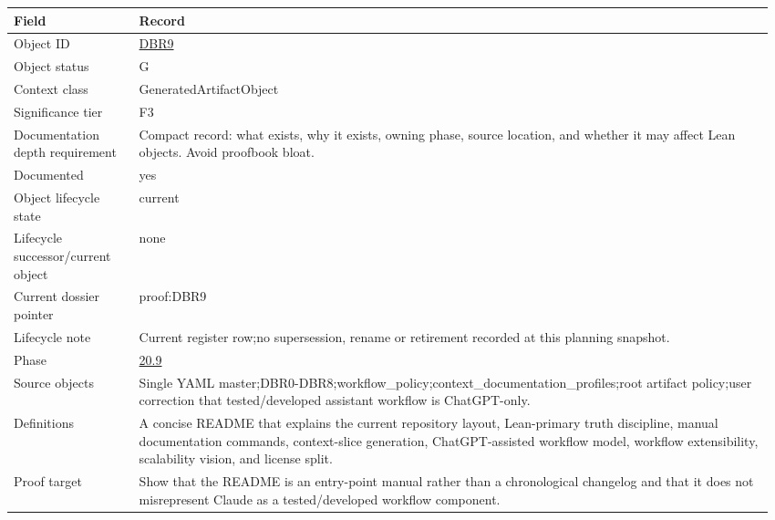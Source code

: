 \begin{longtable}{L{0.16\linewidth} L{0.81\linewidth}}
\hline
\textbf{Field} & \textbf{Record}\\
\hline
Object ID & \hyperlink{object-row-DBR9}{DBR9}\\
\hline\addlinespace[0.20em]
Object status & G\\
\hline\addlinespace[0.20em]
Context class & GeneratedArtifactObject\\
\hline\addlinespace[0.20em]
Significance tier & F3\\
\hline\addlinespace[0.20em]
Documentation depth requirement & Compact record: what exists, why it exists, owning phase, source location, and whether it may affect Lean objects. Avoid proofbook bloat.\\
\hline\addlinespace[0.20em]
Documented & yes\\
\hline\addlinespace[0.20em]
Object lifecycle state & current\\
\hline\addlinespace[0.20em]
Lifecycle successor/\allowbreak{}current object & none\\
\hline\addlinespace[0.20em]
Current dossier pointer & proof:DBR9\\
\hline\addlinespace[0.20em]
Lifecycle note & Current register row;\newline no supersession, rename or retirement recorded at this planning snapshot.\\
\hline\addlinespace[0.20em]
Phase & \hyperlink{phase-row-20-9}{20.9}\\
\hline\addlinespace[0.20em]
Source objects & Single YAML master;\newline DBR0-DBR8;\newline workflow\_policy;\newline context\_documentation\_profiles;\newline root artifact policy;\newline user correction that tested/\allowbreak{}developed assistant workflow is ChatGPT-only.\\
\hline\addlinespace[0.20em]
Definitions & A concise README that explains the current repository layout, Lean-primary truth discipline, manual documentation commands, context-slice generation, ChatGPT-assisted workflow model, workflow extensibility, scalability vision, and license split.\\
\hline\addlinespace[0.20em]
Proof target & Show that the README is an entry-point manual rather than a chronological changelog and that it does not misrepresent Claude as a tested/\allowbreak{}developed workflow component.\\

\end{longtable}
